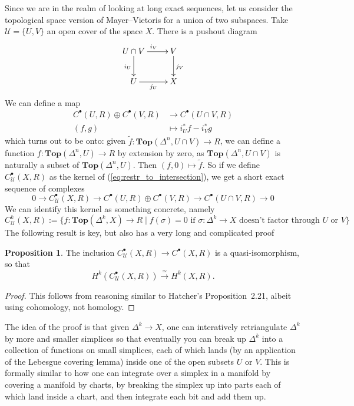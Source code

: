 \documentclass{tufte-handout}
\def\Top {\mathbf{Top}}
\theoremstyle{definition}
\newtheorem{prop}{Proposition}
\begin{document}
Since we are in the realm of looking at long exact sequences, let us consider the topological space version of Mayer--Vietoris for a union of two subspaces. Take $\mathcal{U} = \{U,V\}$ an open cover of the space $X$. There is a pushout diagram
\[
	\xymatrix{
	U\cap V \ar[r]^{i_V} \ar[d]_{i_U} & V \ar[d]^{j_V} \\
	U \ar[r]_{j_U} & X
	}
\]
We can define a map
\begin{align}\label{eq:restr_to_intersection}
C^\bullet(U,R) \oplus C^\bullet(V,R) & \to C^\bullet(U\cap V,R)\\
(f,g) & \mapsto i^*_U f - i^*_Vg
\end{align}
which turns out to be onto: given $\widetilde{f}\colon \Top(\Delta^n,U\cap V) \to R$, we can define a function
$f\colon \Top(\Delta^n,U) \to R$ by extension by zero, as $\Top(\Delta^n,U\cap V)$ is naturally a subset of $\Top(\Delta^n,U)$. Then $(f,0) \mapsto \widetilde{f}$. So if we define $C^\bullet_\mathcal{U}(X,R)$ as the kernel of (\ref{eq:restr_to_intersection}), we get a short exact sequence of complexes
\[
0 \to C^\bullet_\mathcal{U}(X,R) \to C^\bullet(U,R) \oplus C^\bullet(V,R) \to C^\bullet(U\cap V,R) \to 0
\]
We can identify this kernel as something concrete, namely 
\[
	C^k_\mathcal{U}(X,R) := \{f\colon \Top(\Delta^k,X) \to R\mid f(\sigma)=0\text{ if $\sigma\colon \Delta^k\to X$ doesn't factor through $U$ or $V$}\}
\]
The following result is key, but also has a very long and complicated proof
\begin{prop}
The inclusion $C^\bullet_\mathcal{U}(X,R) \to C^\bullet(X,R)$ is a quasi-isomorphism, so that
\[
	H^k(C^\bullet_\mathcal{U}(X,R)) \xrightarrow{\simeq} H^k(X,R).
\]
\end{prop}

\begin{proof}
This follows from reasoning similar to Hatcher's Proposition~2.21, albeit using cohomology, not homology.
\end{proof}

The idea of the proof is that given $\Delta^k \to X$, one can interatively retriangulate $\Delta^k$ by more and smaller simplices so that eventually you can break up $\Delta^k$ into a collection of functions on small simplices, each of which lands (by an application of the Lebesgue covering lemma) inside one of the open subsets $U$ or $V$. This is formally similar to how one can integrate over a simplex in a manifold by covering a manifold by charts, by breaking the simplex up into parts each of which land inside a chart, and then integrate each bit and add them up.
\end{document}
